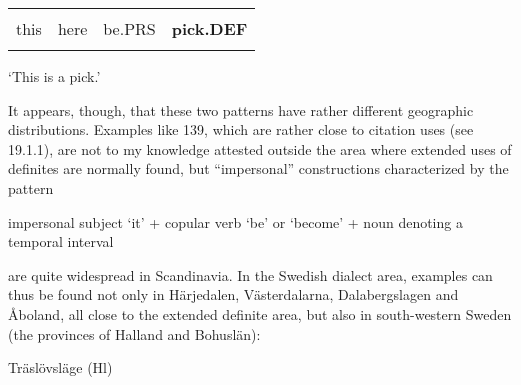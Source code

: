 \begin{tabular}{llll}
\lsptoprule
\multicolumn{4}{l}{De

}\\
this & here & be.PRS & {\bfseries pick.DEF}\\
\lspbottomrule
\end{tabular}

\begin{styleTranslation}
‘This is a pick.’

\end{styleTranslation}

\begin{styleBodyTextFirst}
It appears, though, that these two patterns have rather different geographic distributions. Examples like 139, which are rather close to citation uses (see 19.1.1), are not to my knowledge attested outside the area where extended uses of definites are normally found, but “impersonal” constructions characterized by the pattern

\end{styleBodyTextFirst}

\begin{styleBlockQuote}
impersonal subject ‘it’ + copular verb ‘be’ or ‘become’ + noun denoting a temporal interval

\end{styleBlockQuote}

\begin{styleBodyTextFirst}
are quite widespread in Scandinavia. In the Swedish dialect area, examples can thus be found not only in Härjedalen, Västerdalarna, Dalabergslagen and Åboland, all close to the extended definite area, but also in south-western Sweden (the provinces of Halland and Bohuslän): 

\end{styleBodyTextFirst}

\begin{listWWNumileveli}
\item 

\begin{styleExample}
Träslövsläge (Hl)

\end{styleExample}

\end{listWWNumileveli}

